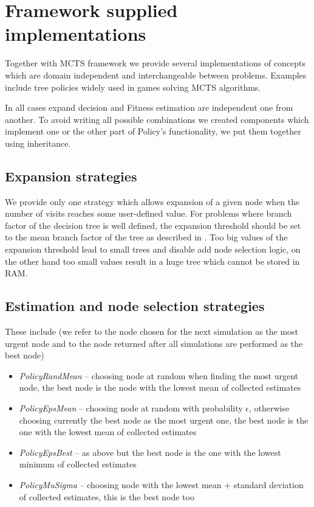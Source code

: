 \section{Framework supplied implementations}

Together with MCTS framework we provide several implementations of concepts
which are domain independent and interchangeable between problems. Examples
include tree policies widely used in games solving MCTS algorithms.

In all cases expand decision and Fitness estimation are independent one from
another. To avoid writing all possible combinations we created components which
implement one or the other part of Policy's functionality, we put them together
using inheritance.

\subsection{Expansion strategies}

We provide only one strategy which allows expansion of a given node when the
number of visits reaches some user-defined value. For problems where branch
factor of the decision tree is well defined, the expansion threshold should be
set to the mean branch factor of the tree as described in \cite{Pawlewicz}.
Too big values of the expansion threshold lead to small trees and disable add
node selection logic, on the other hand too small values result in a huge tree
which cannot be stored in RAM.

\subsection{Estimation and node selection strategies}

These include (we refer to the node chosen for the next simulation as the most
urgent node and to the node returned after all simulations are performed as the
best node)
\begin{itemize}
  \item \emph{PolicyRandMean} -- choosing node at random when finding the most
    urgent node, the best node is the node with the lowest mean of collected
    estimates
  \item \emph{PolicyEpsMean} -- choosing node at random with probability
    $\epsilon$, otherwise choosing currently the best node as the most urgent
    one, the best node is the one with the lowest mean of collected estimates
  \item \emph{PolicyEpsBest} -- as above but the best node is the one with the
    lowest minimum of collected estimates
  \item \emph{PolicyMuSigma} -- choosing node with the lowest mean + standard
    deviation of collected estimates, this is the best node too
\end{itemize}

